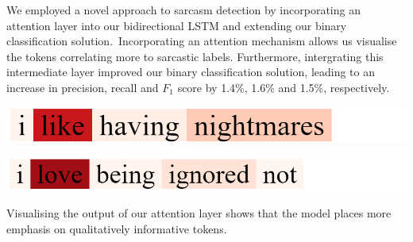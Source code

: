 \documentclass[12pt,a4paper]{article}
\begin{document}
We employed a novel approach to sarcasm detection by incorporating an attention layer into our bidirectional LSTM and extending our binary classification solution.\ Incorporating an attention mechanism allows us visualise the tokens correlating more to sarcastic labels. Furthermore, intergrating this intermediate layer improved our binary classification solution, leading to an increase in precision, recall and $F_1$ score by 1.4\%, 1.6\% and 1.5\%, respectively.\\

\hspace{-5pt}\begin{minipage}{0.5\textwidth}
	\begin{center}
		\hspace{-1cm}\includegraphics[width=1\textwidth]{Images/visualisation1.png}\\
	\end{center}
\end{minipage}
\hspace{-10pt}
\begin{minipage}{0.5\textwidth}
	\begin{center}
		\hspace{-1cm}\includegraphics[width=1\textwidth]{Images/visualisation2.png}\\
	\end{center}	
\end{minipage}\vspace{10pt}
\noindent Visualising the output of our attention layer shows that the model places more emphasis on qualitatively informative tokens.

\end{document}
